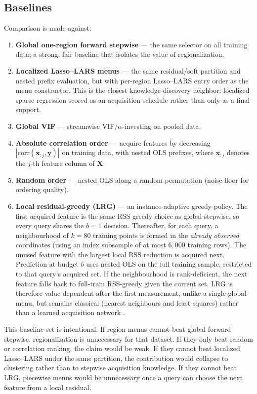 \documentclass[pdflatex,sn-basic,Numbered]{sn-jnl}
\begin{document}
\subsection{Baselines}

Comparison is made against:
\begin{enumerate}
  \item \textbf{Global one-region forward stepwise} --- the same selector on all training data; a strong, fair baseline that isolates the value of regionalization.
  \item \textbf{Localized Lasso--LARS menus} --- the same residual/soft partition and nested prefix evaluation, but with per-region Lasso--LARS entry order \cite{efron2004,yamada2017} as the menu constructor. This is the closest knowledge-discovery neighbor: localized sparse regression scored as an acquisition schedule rather than only as a final support.
  \item \textbf{Global VIF} --- streamwise VIF/\(\alpha\)-investing on pooled data.
  \item \textbf{Absolute correlation order} --- acquire features by decreasing \(|\mathrm{corr}(\mathbf{x}_{:j},\mathbf{y})|\) on training data, with nested OLS prefixes, where \(\mathbf{x}_{:j}\) denotes the \(j\)-th feature column of \(\mathbf{X}\).
  \item \textbf{Random order} --- nested OLS along a random permutation (noise floor for ordering quality).
  \item \textbf{Local residual-greedy (LRG)} --- an instance-adaptive greedy policy. The first acquired feature is the same RSS-greedy choice as global stepwise, so every query shares the \(b=1\) decision. Thereafter, for each query, a neighbourhood of \(k=80\) training points is formed in the \emph{already observed} coordinates (using an index subsample of at most \(6{,}000\) training rows). The unused feature with the largest local RSS reduction is acquired next. Prediction at budget \(b\) uses nested OLS on the full training sample, restricted to that query's acquired set. If the neighbourhood is rank-deficient, the next feature falls back to full-train RSS-greedy given the current set. LRG is therefore value-dependent after the first measurement, unlike a single global menu, but remains classical (nearest neighbours and least squares) rather than a learned acquisition network \cite{ma2019,covert2023}.
\end{enumerate}

This baseline set is intentional. If region menus cannot beat global forward stepwise, regionalization is unnecessary for that dataset. If they only beat random or correlation ranking, the claim would be weak. If they cannot beat localized Lasso--LARS under the same partition, the contribution would collapse to clustering rather than to stepwise acquisition knowledge. If they cannot beat LRG, piecewise menus would be unnecessary once a query can choose the next feature from a local residual.
\end{document}
